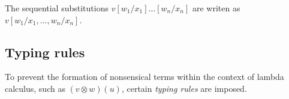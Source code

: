 \begin{comment}
  \hspace{-23pt}\text{In the next two cases, }\Gamma,x: \mathbb{A}  \in \text{Sf}(&\Gamma_1,\Gamma_2), \Gamma_1 \triangleright v \text{, } \Gamma_2, y: \mathbb{D}\triangleright a   \text{, and } \\
   & \hspace{-66pt} \Gamma_2, z: \mathbb{E}\triangleright b  \\
   \hspace{-23pt} \text{case } v \,  
  \left\{
    \begin{aligned} 
    &\inl_{\typeI}(y) \Rightarrow a; \\
    &\inr_{\typeI}(z) \Rightarrow  b  \\ 
  \end{aligned}  
  \right\}[w/x] &=  \text{case } v [w/x]  \,  
  \left\{
    \begin{aligned} 
    &\inl_{\typeI}(y) \Rightarrow a; \\
    &\inr_{\typeI}(z) \Rightarrow  b  \\ 
  \end{aligned}  
  \right\}  &  (\text{ if } x: \mathbb{A} \in \Gamma_1) \\
  \text{case } v \,  
  \left\{
    \begin{aligned} 
    &\inl_{\typeE}(y) \Rightarrow a; \\
    &\inr_{\typeD}(z) \Rightarrow  b  \\ 
  \end{aligned}  
  \right\}[w/x] &=  \text{case } v   \,  
  \left\{
    \begin{aligned} 
    &\inl_{\typeE}(y) \Rightarrow a [w/x]; \\
    &\inr_{\typeD}(z) \Rightarrow  b [w/x]  \\ 
  \end{aligned}  
  \right\}  &  (\text{ if } x: \mathbb{A} \in \Gamma_2) \\
     \end{comment}

The sequential substitutions $v[w_1/x_1] \ldots [w_n/x_n]$ are writen as $v[w_1/x_1, \ldots ,w_n/x_n]$.


\subsection{Typing rules}

To prevent the formation of nonsensical terms within the context of lambda calculus, such as $(v \otimes w) (u)$, certain \emph{typing rules} are imposed.

